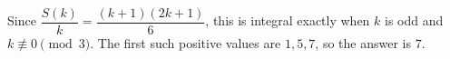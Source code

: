 Since $\dfrac{S(k)}{k}=\dfrac{(k+1)(2k+1)}{6}$, this is integral exactly when $k$ is odd and $k\not\equiv0\pmod3$. The first such positive values are $1,5,7$, so the answer is $\boxed7$.
